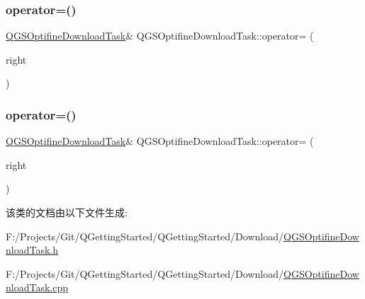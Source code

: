\subsubsection{\texorpdfstring{operator=()}{operator=()}\hspace{0.1cm}{\footnotesize\ttfamily [1/2]}}
{\footnotesize\ttfamily \mbox{\hyperlink{class_q_g_s_optifine_download_task}{Q\+G\+S\+Optifine\+Download\+Task}}\& Q\+G\+S\+Optifine\+Download\+Task\+::operator= (\begin{DoxyParamCaption}\item[{const \mbox{\hyperlink{class_q_g_s_optifine_download_task}{Q\+G\+S\+Optifine\+Download\+Task}} \&}]{right }\end{DoxyParamCaption})\hspace{0.3cm}{\ttfamily [delete]}}

\mbox{\label{class_q_g_s_optifine_download_task_a3b50035310577dd35cb2c0d56b283797}} 
\subsubsection{\texorpdfstring{operator=()}{operator=()}\hspace{0.1cm}{\footnotesize\ttfamily [2/2]}}
{\footnotesize\ttfamily \mbox{\hyperlink{class_q_g_s_optifine_download_task}{Q\+G\+S\+Optifine\+Download\+Task}}\& Q\+G\+S\+Optifine\+Download\+Task\+::operator= (\begin{DoxyParamCaption}\item[{\mbox{\hyperlink{class_q_g_s_optifine_download_task}{Q\+G\+S\+Optifine\+Download\+Task}} \&\&}]{right }\end{DoxyParamCaption})\hspace{0.3cm}{\ttfamily [delete]}}



该类的文档由以下文件生成\+:\begin{DoxyCompactItemize}
\item 
F\+:/\+Projects/\+Git/\+Q\+Getting\+Started/\+Q\+Getting\+Started/\+Download/\mbox{\hyperlink{_q_g_s_optifine_download_task_8h}{Q\+G\+S\+Optifine\+Download\+Task.\+h}}\item 
F\+:/\+Projects/\+Git/\+Q\+Getting\+Started/\+Q\+Getting\+Started/\+Download/\mbox{\hyperlink{_q_g_s_optifine_download_task_8cpp}{Q\+G\+S\+Optifine\+Download\+Task.\+cpp}}\end{DoxyCompactItemize}
